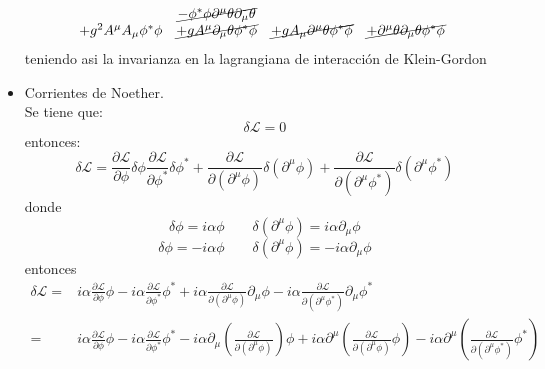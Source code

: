 \begin{itemize}
\begin{equation*}
\begin{matrix}
        &\cancel{- \phi^* \phi \partial^\mu \theta\partial_\mu \theta}\\
         +g^2A^\mu A_\mu\phi^* \phi  
        &\cancel{+ gA^\mu \partial_\mu \theta\phi^* \phi } 
        &\cancel{+ gA_\mu \partial^\mu \theta\phi^* \phi} 
        &\cancel{ + \partial^\mu \theta \partial_\mu \theta\phi^* \phi}\
    \end{matrix}
    \end{equation*}
    teniendo asi la invarianza en la lagrangiana de interacción de Klein-Gordon
    \item Corrientes de Noether.\\
    Se tiene que:
    \begin{equation*}
        \delta \mathcal{L}=0
    \end{equation*}
    entonces:
    \begin{equation*}
        \delta \mathcal{L} = \frac{\partial \mathcal{L}}{\partial \phi} \delta \phi \frac{\partial \mathcal{L}}{\partial \phi^*} \delta \phi^*+ \frac{\partial \mathcal{L}}{\partial (\partial^\mu \phi)} \delta (\partial^\mu \phi)  +\frac{\partial \mathcal{L}}{\partial (\partial^\mu {\phi}^*)} \delta (\partial^\mu {\phi}^*)
    \end{equation*}
    donde \begin{equation*}
        \delta \phi = i\alpha \phi \qquad \delta (\partial^\mu\phi) = i\alpha \partial_\mu  \phi
    \end{equation*}
    \begin{equation*}
        \delta \phi = -i\alpha \phi \qquad \delta (\partial^\mu\phi) = -i\alpha \partial_\mu  \phi
    \end{equation*}
    entonces\begin{align*}
        \delta \mathcal{L} =& i\alpha \frac{\partial \mathcal{L}}{\partial \phi} \phi-i\alpha \frac{\partial \mathcal{L}}{\partial \phi^*} \phi^* + i\alpha \frac{\partial \mathcal{L}}{\partial (\partial^\mu \phi)} \partial_\mu \phi - i\alpha \frac{\partial \mathcal{L}}{\partial (\partial^\mu {\phi}^*)} \partial_\mu {\phi}^*\\
        =& i\alpha \frac{\partial \mathcal{L}}{\partial \phi } \phi -i\alpha \frac{\partial \mathcal{L}}{\partial \phi^* } \phi^* -i\alpha \partial_\mu \left(\frac{\partial \mathcal{L}}{\partial (\partial^\mu \phi)}\right) \phi + i\alpha \partial^\mu \left( \frac{\partial \mathcal{L}}{\partial (\partial^\mu \phi)} \phi \right) - i\alpha\partial^\mu \left( \frac{\partial \mathcal{L}}{\partial (\partial^\mu {\phi}^*)} {\phi}^* \right) \\

\end{align*}
\end{itemize}
